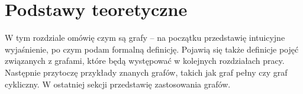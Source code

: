 \chapter{Podstawy teoretyczne}

W tym rozdziale omówię czym są grafy -- na początku przedstawię intuicyjne wyjaśnienie, po czym podam formalną definicję. Pojawią się także definicje pojęć związanych z grafami, które będą występować w kolejnych rozdziałach pracy. Następnie przytoczę przykłady znanych grafów, takich jak graf pełny czy graf cykliczny. W ostatniej sekcji przedstawię zastosowania grafów.





